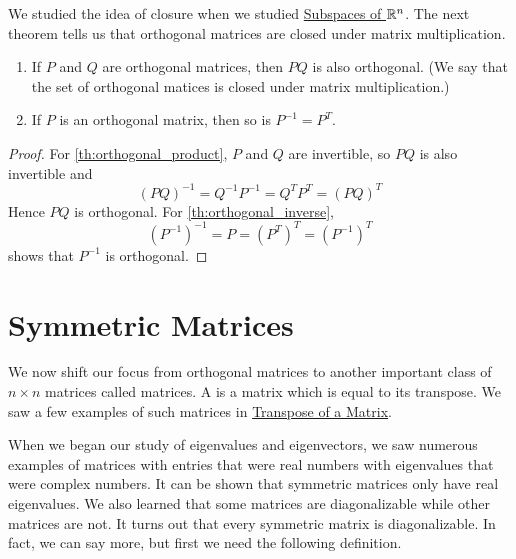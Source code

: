 \documentclass{ximera}
\begin{document}
We studied the idea of closure when we studied \href{https://ximera.osu.edu/oerlinalg/LinearAlgebra/VSP-0020/main}{Subspaces of $\mathbb{R}^n$}.  The next theorem tells us that orthogonal matrices are closed under matrix multiplication.

\begin{theorem}\label{th:orthogonal_product_inverse}
\begin{enumerate}
    \item\label{th:orthogonal_product}
    If $P$ and $Q$ are orthogonal matrices, then $PQ$ is also orthogonal. (We say that the set of orthogonal matices is closed under matrix multiplication.)
    \item\label{th:orthogonal_inverse}
    If $P$ is an orthogonal matrix, then so is $P^{-1} = P^{T}$.
\end{enumerate}

\begin{proof}
For \ref{th:orthogonal_product}, $P$ and $Q$ are invertible, so $PQ$ is also invertible and
\begin{equation*}
(PQ)^{-1} = Q^{-1}P^{-1} = Q^{T}P^{T} = (PQ)^{T}
\end{equation*}
Hence $PQ$ is orthogonal. For \ref{th:orthogonal_inverse},
\begin{equation*}
(P^{-1})^{-1} = P = (P^{T})^{T} = (P^{-1})^{T}
\end{equation*}
shows that $P^{-1}$ is orthogonal.
\end{proof}
\end{theorem}

\section*{Symmetric Matrices}

We now shift our focus from orthogonal matrices to another important class of $n \times n$ matrices called  matrices.  A  is a matrix which is equal to its transpose.  We saw a few examples of such matrices in \href{https://ximera.osu.edu/oerlinalg/LinearAlgebra/MAT-0025/main}{Transpose of a Matrix}.

When we began our study of eigenvalues and eigenvectors, we saw numerous examples of matrices with entries that were real numbers with eigenvalues that were complex numbers.  It can be shown that symmetric matrices only have real eigenvalues.  We also learned that some matrices are diagonalizable while other matrices are not.  It turns out that every symmetric matrix is diagonalizable.  In fact, we can say more, but first we need the following definition.
\end{document}
